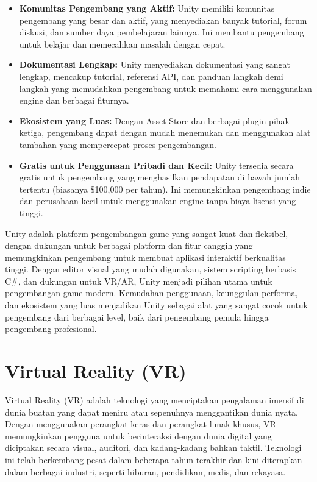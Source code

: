 \begin{itemize}
    \item \textbf{Komunitas Pengembang yang Aktif:} Unity memiliki komunitas pengembang yang besar dan aktif, yang menyediakan banyak tutorial, forum diskusi, dan sumber daya pembelajaran lainnya. Ini membantu pengembang untuk belajar dan memecahkan masalah dengan cepat.
    \item \textbf{Dokumentasi Lengkap:} Unity menyediakan dokumentasi yang sangat lengkap, mencakup tutorial, referensi API, dan panduan langkah demi langkah yang memudahkan pengembang untuk memahami cara menggunakan engine dan berbagai fiturnya.
    \item \textbf{Ekosistem yang Luas:} Dengan Asset Store dan berbagai plugin pihak ketiga, pengembang dapat dengan mudah menemukan dan menggunakan alat tambahan yang mempercepat proses pengembangan.
    \item \textbf{Gratis untuk Penggunaan Pribadi dan Kecil:} Unity tersedia secara gratis untuk pengembang yang menghasilkan pendapatan di bawah jumlah tertentu (biasanya \$100,000 per tahun). Ini memungkinkan pengembang indie dan perusahaan kecil untuk menggunakan engine tanpa biaya lisensi yang tinggi.
\end{itemize}

Unity adalah platform pengembangan game yang sangat kuat dan fleksibel, dengan dukungan untuk berbagai platform dan fitur canggih yang memungkinkan pengembang untuk membuat aplikasi interaktif berkualitas tinggi. Dengan editor visual yang mudah digunakan, sistem scripting berbasis C\#, dan dukungan untuk VR/AR, Unity menjadi pilihan utama untuk pengembangan game modern. Kemudahan penggunaan, keunggulan performa, dan ekosistem yang luas menjadikan Unity sebagai alat yang sangat cocok untuk pengembang dari berbagai level, baik dari pengembang pemula hingga pengembang profesional.


\section{Virtual Reality (VR)}
\label{sec:virtualreality}

Virtual Reality (VR) adalah teknologi yang menciptakan pengalaman imersif di dunia buatan yang dapat meniru atau sepenuhnya menggantikan dunia nyata. Dengan menggunakan perangkat keras dan perangkat lunak khusus, VR memungkinkan pengguna untuk berinteraksi dengan dunia digital yang diciptakan secara visual, auditori, dan kadang-kadang bahkan taktil. Teknologi ini telah berkembang pesat dalam beberapa tahun terakhir dan kini diterapkan dalam berbagai industri, seperti hiburan, pendidikan, medis, dan rekayasa.

